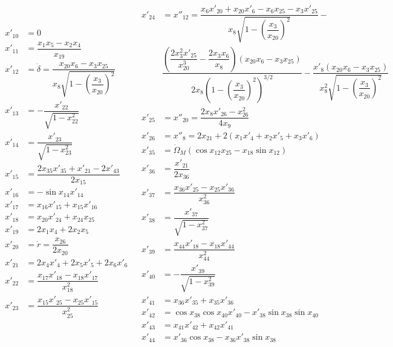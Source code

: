  \begin{align} \label{eq:derTransAnglAux}
\begin{split}
x'_{10} &= 0 \\
x'_{11} &=  \dfrac{x_{1}x_{5}-x_{2}x_{4}}{x_{19}}\\
x'_{12} &= \dot{\delta} = \dfrac{x_{20}x_{6}-x_{3}x_{25}}{x_{8} \sqrt{1-\left(\dfrac{x_{3}}{x_{20}}\right)^{2}}}\\
x'_{13} &= -\dfrac{x'_{22}}{\sqrt{1-x_{22}^{2}}}\\
x'_{14} &= \dfrac{x'_{23}}{\sqrt{1-x_{23}^{2}}}\\
x'_{15} &= \dfrac{2x_{35}x'_{35}+x'_{21}-2x'_{43}}{2x_{15}} \\
x'_{16} &= -\sin x_{14}x'_{14}\\
x'_{17} &= x_{16}x'_{15}+x_{15}x'_{16}\\
x'_{18} &= x_{20}x'_{24}+x_{24}x_{25}\\
x'_{19} &= 2x_{1}x_{4}+2x_{2}x_{5}\\
x'_{20} &= \dot{r} = \dfrac{x_{26}}{2 x_{20}}\\
x'_{21} &= 2x_{4}x'_{4}+2x_{5}x'_{5}+2x_{6}x'_{6}\\
x'_{22} &= \dfrac{x_{17}x'_{18}-x_{18}x'_{17}}{x_{18}^{2}}\\
x'_{23} &= \dfrac{x_{15}x'_{25}-x_{25}x'_{15}}{x_{25}^{2}}\\
\end{split}
&
\begin{split}
x'_{24} &= x''_{12} = \dfrac{x_{6}x'_{20}+x_{20}x'_{6}-x_{6}x_{25}-x_{3}x'_{25}}{x_{8}\sqrt{1-\left(\dfrac{x_{3}}{x_{20}}\right)^{2}}}-\\
&\dfrac{\left(\dfrac{2x_{3}^{2}x'_{25}}{x_{20}^{3}}-\dfrac{2x_{3}x_{6}}{x_{8}}\right)\left(x_{20}x_{6}-x_{3}x_{25}\right)}{2x_{8}\left(1-\left(\dfrac{x_{3}}{x_{20}}\right)^{2}\right)^{3/2}}-\dfrac{x'_{8}\left(x_{20}x_{6}-x_{3}x_{25}\right)}{x_{8}^{2}\sqrt{1-\left(\dfrac{x_{3}}{x_{20}}\right)^{2}}}\\
x'_{25} &= x''_{20} = \dfrac{2x_{8}x'_{26}-x_{26}^{2}}{4x_{9}}\\
x'_{26} &= x''_{8} = 2x_{21}+2\left(x_{1}x'_{4}+x_{2}x'_{5}+x_{3}x'_{6}\right)\\
x'_{35} &=  \dot{\Omega}_{M}\left(\cos x_{12}x_{25}-x_{18}\sin x_{12}\right) \\
x'_{36} &=  \dfrac{x'_{21}}{2x_{36}} \\
x'_{37} &= \dfrac{x_{36}x'_{25}-x_{25}x'_{36}}{x_{36}^{2}} \\
x'_{38} &= \dfrac{x'_{37}}{\sqrt{1-x_{37}^{2}}} \\ 
x'_{39} &= \dfrac{x_{44}x'_{18}-x_{18}x'_{44}}{x_{44}^{2}} \\
x'_{40} &=  -\dfrac{x'_{39}}{\sqrt{1-x_{39}^{2}}}\\
x'_{41} &= x_{36}x'_{35}+x_{35}x'_{36}\\ 
x'_{42} &= \cos x_{38} \cos x_{40} x'_{40}-x'_{38} \sin x_{38} \sin x_{40}\\
x'_{43} &= x_{41}x'_{42}+x_{42}x'_{41} \\ 
x'_{44} & = x'_{36} \cos x_{38}-x_{36} x'_{38}\sin x_{38}\\
\end{split}
\end{align}

